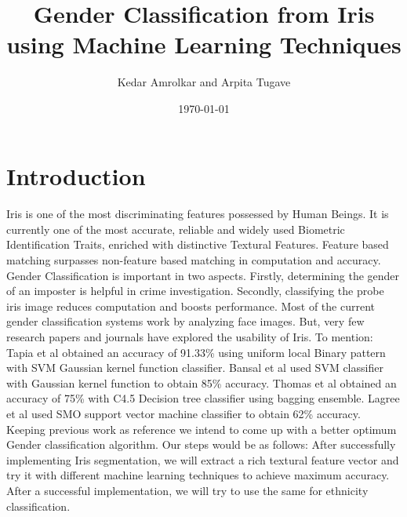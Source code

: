 \documentclass[11pt]{article}
\title{Gender Classification from Iris using Machine Learning Techniques}
\author{Kedar Amrolkar and Arpita Tugave}
\date{\today}
\begin{document}
\maketitle
{}

\section{Introduction}
\paragraph{}
Iris is one of the most discriminating features possessed by Human Beings. It is currently one of the most accurate, reliable and widely used Biometric Identification Traits, enriched with distinctive Textural Features. Feature based matching surpasses non-feature based matching in computation and accuracy. Gender Classification is important in two aspects. Firstly, determining the gender of an imposter is helpful in crime investigation. Secondly, classifying the probe iris image reduces computation and boosts performance. Most of the current gender classification systems work by analyzing face images. But, very few research papers and journals have explored the usability of Iris.  To mention: Tapia et al \cite{Tapia} obtained an accuracy of 91.33\% using uniform local Binary pattern with SVM Gaussian kernel function classifier. Bansal et al \cite{Bansal} used SVM classifier with Gaussian kernel function to obtain 85\% accuracy. Thomas et al \cite{Thomas} obtained an accuracy of 75\% with C4.5 Decision tree classifier using bagging ensemble. Lagree et al \cite{Lagree} used SMO support vector machine classifier to obtain 62\% accuracy. Keeping previous work as reference we intend to come up with a better optimum Gender classification algorithm. Our steps would be as follows: After successfully implementing Iris segmentation, we will extract a rich textural feature vector and try it with different machine learning techniques to achieve maximum accuracy. After a successful implementation, we will try to use the same for ethnicity classification. 


{}
\end{document}
